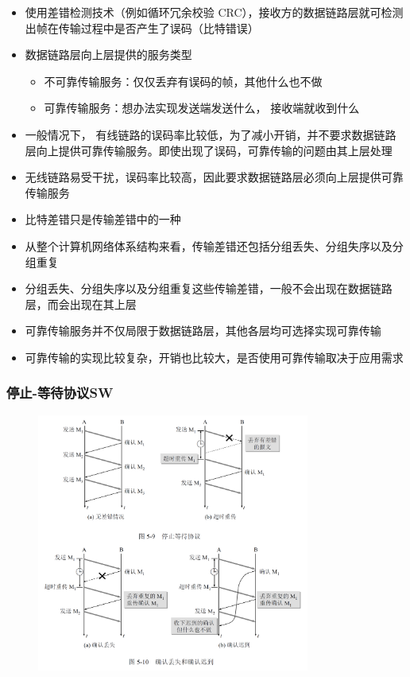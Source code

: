 \documentclass[cs4size,a4paper,10pt]{ctexart}
\begin{document}
	\begin{itemize}
		\item 使用差错检测技术（例如循环冗余校验 CRC），接收方的数据链路层就可检测出帧在传输过程中是否产生了误码（比特错误）
		\item 数据链路层向上层提供的服务类型
		\begin{itemize}
			\item 不可靠传输服务：仅仅丢弃有误码的帧，其他什么也不做
			\item 可靠传输服务：想办法实现发送端发送什么， 接收端就收到什么
		\end{itemize}
		\item 一般情况下， 有线链路的误码率比较低，为了减小开销，并不要求数据链路层向上提供可靠传输服务。即使出现了误码，可靠传输的问题由其上层处理
		\item 无线链路易受干扰，误码率比较高，因此要求数据链路层必须向上层提供可靠传输服务
		\item 比特差错只是传输差错中的一种
		\item 从整个计算机网络体系结构来看，传输差错还包括分组丢失、分组失序以及分组重复
		\item 分组丢失、分组失序以及分组重复这些传输差错，一般不会出现在数据链路层，而会出现在其上层
		\item 可靠传输服务并不仅局限于数据链路层，其他各层均可选择实现可靠传输
		\item 可靠传输的实现比较复杂，开销也比较大，是否使用可靠传输取决于应用需求
	\end{itemize}

	\subsubsection{停止-等待协议SW}
	\begin{figure}[H]
		\centering
		\includegraphics[width=0.8\textwidth]{img/3.2.2.1
		}
	\end{figure}
\end{document}

